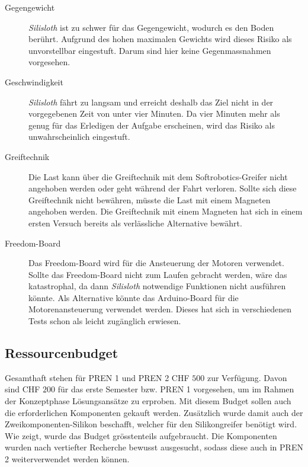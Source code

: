 \begin{description}
\item[Gegengewicht] \textit{Silisloth} ist zu schwer für das Gegengewicht, wodurch es den Boden berührt. Aufgrund des hohen maximalen Gewichts wird dieses Risiko als unvorstellbar eingestuft. Darum sind hier keine Gegenmassnahmen vorgesehen.
\item[Geschwindigkeit] \textit{Silisloth} fährt zu langsam und erreicht deshalb das Ziel nicht in der vorgegebenen Zeit von unter vier Minuten. Da vier Minuten mehr als genug für das Erledigen der Aufgabe erscheinen, wird das Risiko als unwahrscheinlich eingestuft. 
\item[Greiftechnik] Die Last kann über die Greiftechnik mit dem Softrobotics-Greifer nicht angehoben werden oder geht während der Fahrt verloren. Sollte sich diese Greiftechnik nicht bewähren, müsste die Last mit einem Magneten angehoben werden. Die Greiftechnik mit einem Magneten hat sich in einem ersten Versuch bereits als verlässliche Alternative bewährt.
\item[Freedom-Board] Das Freedom-Board wird für die Ansteuerung der Motoren verwendet. Sollte das Freedom-Board nicht zum Laufen gebracht werden, wäre das katastrophal, da dann \textit{Silisloth} notwendige Funktionen nicht ausführen könnte. Als Alternative könnte das Arduino-Board für die Motorenansteuerung verwendet werden. Dieses hat sich in verschiedenen Tests schon als leicht zugänglich erwiesen.
\end{description}

\subsection{Ressourcenbudget}
\label{sec:budget}

Gesamthaft stehen für PREN 1 und PREN 2 CHF $500$ zur Verfügung. Davon sind CHF $200$ für das erste Semester bzw. PREN 1 vorgesehen, um im Rahmen der Konzeptphase Lösungsansätze zu erproben. Mit diesem Budget sollen auch die erforderlichen Komponenten gekauft werden. Zusätzlich wurde damit auch der Zweikomponenten-Silikon beschafft, welcher für den Silikongreifer benötigt wird. Wie  zeigt, wurde das Budget grösstenteils aufgebraucht. Die Komponenten wurden nach vertiefter Recherche bewusst ausgesucht, sodass diese auch in PREN 2 weiterverwendet werden können.

